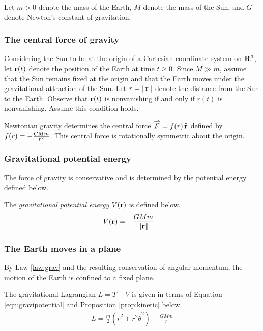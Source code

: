 Let $m > 0$ denote the mass of the Earth, $M$ denote the mass of the Sun, and $G$ denote Newton's constant of gravitation.

\subsubsection{The central force of gravity}

Considering the Sun to be at the origin of a Cartesian coordinate system on $\mathbf{R}^3$, let $\mathbf{r}(t)$ denote the position of the Earth at time $t \geq 0$.
Since $M \gg m$, assume that the Sun remains fixed at the origin and that the Earth moves under the gravitational attraction of the Sun.
Let $r = \left\|\mathbf{r}\right\|$ denote the distance from the Sun to the Earth.
Observe that $\mathbf{r}(t)$ is nonvanishing if and only if $r(t)$ is nonvanishing.
Assume this condition holds.

\begin{law}[Gravity]\label{law:grav}
	Newtonian gravity determines the central force $\overrightarrow{F} = f\!\left(r\right) \widehat{\mathbf{r}}$ defined by $f\!\left(r\right) = - \frac{G M m}{r^2}$.
	This central force is rotationally symmetric about the origin.
\end{law}

\subsubsection{Gravitational potential energy}

The force of gravity is conservative and is determined by the potential energy defined below.

\begin{definition}
	The \emph{gravitational potential energy} $V\!\left(\mathbf{r}\right)$ is defined below.
	\begin{align}\label{eqn:gravipotential}
		V\!\left(\mathbf{r}\right) & = - \frac{G M m}{\left\|\mathbf{r}\right\|}
	\end{align}
\end{definition}

\subsubsection{The Earth moves in a plane}

By Law \ref{law:grav} and the resulting conservation of angular momentum, the motion of the Earth is confined to a fixed plane.

The gravitational Lagrangian $L = T - V$ is given in terms of Equation \eqref{eqn:gravipotential} and Proposition \ref{prop:kinetic} below.
\begin{align}
	L = \frac{m}{2}\left(\dot{r}^2 + r^2 \dot{\theta}^2\right) + \frac{G M m}{r}
\end{align}

